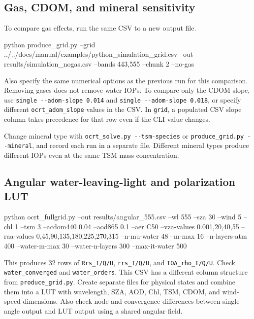 \subsection{Gas, CDOM, and mineral sensitivity}
\label{sec:auto:06_python_batch:7.4}
To compare gas effects, run the same CSV to a new output file.


\begin{ManualCode}
python produce_grid.py --grid ../../docs/manual/examples/python_simulation_grid.csv --out results/simulation_nogas.csv --bands 443,555 --chunk 2 --no-gas
\end{ManualCode}

Also specify the same numerical options as the previous run for this comparison. Removing gases does not remove water IOPs. To compare only the CDOM slope, use \texttt{single -\allowbreak{}-\allowbreak{}adom-\allowbreak{}slope 0.\allowbreak{}014} and \texttt{single -\allowbreak{}-\allowbreak{}adom-\allowbreak{}slope 0.\allowbreak{}018}, or specify different \texttt{ocrt\_\allowbreak{}adom\_\allowbreak{}slope} values in the CSV. In \texttt{grid}, a populated CSV slope column takes precedence for that row even if the CLI value changes.

Change mineral type with \texttt{ocrt\_\allowbreak{}solve.\allowbreak{}py -\allowbreak{}-\allowbreak{}tsm-\allowbreak{}species} or \texttt{produce\_\allowbreak{}grid.\allowbreak{}py -\allowbreak{}-\allowbreak{}mineral}, and record each run in a separate file. Different mineral types produce different IOPs even at the same TSM mass concentration.

\subsection{Angular water-leaving-light and polarization LUT}
\label{sec:auto:06_python_batch:7.5}

\begin{ManualCode}
python ocrt_fullgrid.py --out results/angular_555.csv --wl 555 --sza 30 --wind 5 --chl 1 --tsm 3 --acdom440 0.04 --aod865 0.1 --aer C50 --vza-values 0.001,20,40,55 --raa-values 0,45,90,135,180,225,270,315 --n-mu-water 48 --m-max 16 --n-layers-atm 400 --water-m-max 30 --water-n-layers 300 --max-it-water 500
\end{ManualCode}

This produces 32 rows of \texttt{Rrs\_\allowbreak{}I/\allowbreak{}Q/\allowbreak{}U}, \texttt{rrs\_\allowbreak{}I/\allowbreak{}Q/\allowbreak{}U}, and \texttt{TOA\_\allowbreak{}rho\_\allowbreak{}I/\allowbreak{}Q/\allowbreak{}U}. Check \texttt{water\_\allowbreak{}converged} and \texttt{water\_\allowbreak{}orders}. This CSV has a different column structure from \texttt{produce\_\allowbreak{}grid.\allowbreak{}py}. Create separate files for physical states and combine them into a LUT with wavelength, SZA, AOD, Chl, TSM, CDOM, and wind-speed dimensions. Also check node and convergence differences between single-angle output and LUT output using a shared angular field.

